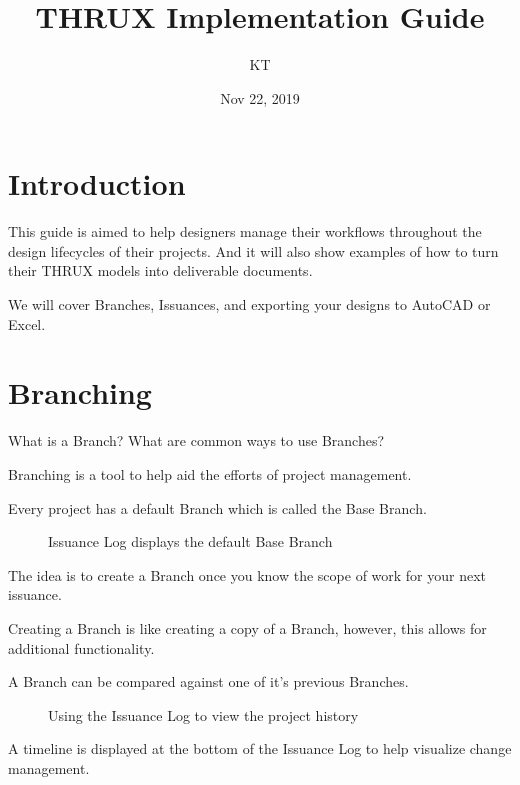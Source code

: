 \documentclass[letterpaper,10pt,english]{sphinxmanual}
\title{THRUX Implementation Guide}
\date{Nov 22, 2019}
\author{KT}
\begin{document}
\pagestyle{empty}
\sphinxmaketitle
\pagestyle{plain}
\sphinxtableofcontents
\pagestyle{normal}
\label{\detokenize{index::doc}}



\chapter{Introduction}
\label{\detokenize{index:introduction}}
This guide is aimed to help designers manage their workflows throughout the design lifecycles of their projects.  And it will also show examples of how to turn their THRUX models into deliverable documents.

We will cover Branches, Issuances, and exporting your designs to AutoCAD or Excel.


\chapter{Branching}
\label{\detokenize{index:branching}}\label{\detokenize{index:id1}}
What is a Branch?  What are common ways to use Branches?

Branching is a tool to help aid the efforts of project management.

Every project has a default Branch which is called the Base Branch.

\begin{figure}[H]
\centering
\capstart

\noindent{}
\caption{Issuance Log displays the default Base Branch}\label{\detokenize{index:id2}}\end{figure}

The idea is to create a Branch once you know the scope of work for your next issuance.

Creating a Branch is like creating a copy of a Branch, however, this allows for additional functionality.

A Branch can be compared against one of it’s previous Branches.

\begin{figure}[H]
\centering
\capstart

\noindent{}
\caption{Using the Issuance Log to view the project history}\label{\detokenize{index:id3}}\end{figure}

A timeline is displayed at the bottom of the Issuance Log to help visualize change management.
\end{document}
